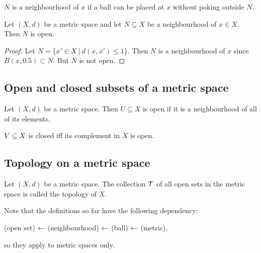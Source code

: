 \begin{remark*}
  $N$ is a neighbourhood of $x$ if a ball can be placed at $x$ without poking outside $N$.
\end{remark*}

\begin{theorem*}
  Let $(X, d)$ be a metric space and let $N \subseteq X$ be a neighbourhood of $x \in X$. Then $N$
  is open.

\end{theorem*}

\begin{proof}
  Let $N = \{x' \in X ~|~ d(x, x') \leq 1\}$. Then $N$ is a neighbourhood of $x$ since
  $B(x, 0.5) \subset N$. But $N$ is not open.
\end{proof}





\subsection{Open and closed subsets of a metric space}
\begin{definition}
  Let $(X, d)$ be a metric space. Then $U \subseteq X$ is open if it is a neighbourhood of all of
  its elements.

  $V \subseteq X$ is closed iff its complement in $X$ is open.
\end{definition}

\subsection{Topology on a metric space}
\begin{definition}
  Let $(X, d)$ be a metric space. The collection $\mathcal T$ of all open sets in the metric space is
  called the topology of $X$.
\end{definition}

\begin{remark*}
  Note that the definitions so far have the following dependency:

  (open set) $\leftarrow$ (neighbourhood) $\leftarrow$ (ball) $\leftarrow$ (metric),

  so they apply to metric spaces only.
\end{remark*}

